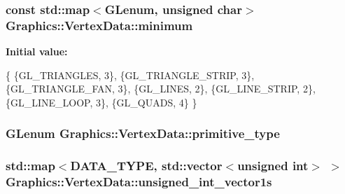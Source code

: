 \subsubsection[{minimum}]{\setlength{\rightskip}{0pt plus 5cm}const std\+::map$<$G\+Lenum, unsigned char$>$ Graphics\+::\+Vertex\+Data\+::minimum\hspace{0.3cm}{\ttfamily [private]}}\label{class_graphics_1_1_vertex_data_a65a814100217b32cc5a1f7a9bbd7f13c}
{\bfseries Initial value\+:}
\begin{DoxyCode}
\{
        \{GL\_TRIANGLES, 3\},
        \{GL\_TRIANGLE\_STRIP, 3\},
        \{GL\_TRIANGLE\_FAN, 3\},
        \{GL\_LINES, 2\},
        \{GL\_LINE\_STRIP, 2\},
        \{GL\_LINE\_LOOP, 3\},
        \{GL\_QUADS, 4\}
      \}
\end{DoxyCode}
\hypertarget{class_graphics_1_1_vertex_data_a3940832a3699c42ea2d9f4e0943653aa}{}
\subsubsection[{primitive\+\_\+type}]{\setlength{\rightskip}{0pt plus 5cm}G\+Lenum Graphics\+::\+Vertex\+Data\+::primitive\+\_\+type\hspace{0.3cm}{\ttfamily [private]}}\label{class_graphics_1_1_vertex_data_a3940832a3699c42ea2d9f4e0943653aa}
\hypertarget{class_graphics_1_1_vertex_data_abd5405c2b07bc0b93cf6fc05b2c5ce0c}{}
\subsubsection[{unsigned\+\_\+int\+\_\+vector1s}]{\setlength{\rightskip}{0pt plus 5cm}std\+::map$<${\bf D\+A\+T\+A\+\_\+\+T\+Y\+P\+E}, std\+::vector$<$unsigned int$>$ $>$ Graphics\+::\+Vertex\+Data\+::unsigned\+\_\+int\+\_\+vector1s\hspace{0.3cm}{\ttfamily [private]}}\label{class_graphics_1_1_vertex_data_abd5405c2b07bc0b93cf6fc05b2c5ce0c}
\hypertarget{class_graphics_1_1_vertex_data_a7c1edb826a504590a160d8a6d7ab9ae8}{}
